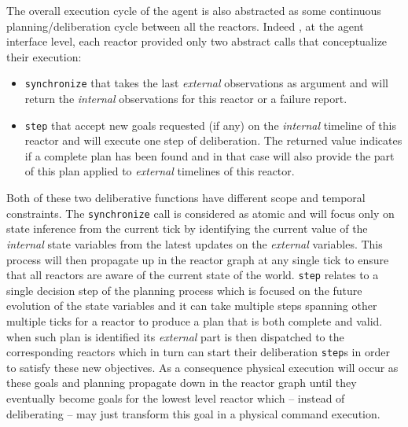 The overall execution cycle of the agent is also abstracted as some
continuous planning/deliberation cycle between all the
reactors. Indeed , at the agent interface level, each reactor provided
only two abstract calls that conceptualize their execution:
\begin{itemize}
\item \texttt{synchronize} that takes the last {\em external}
  observations as argument and will return the {\em internal}
  observations for this reactor or a failure report.
\item \texttt{step} that accept new goals requested (if any) on the
  {\em internal} timeline of this reactor and will execute one step of
  deliberation. The returned value indicates if a complete plan has
  been found and in that case will also provide the part of this plan
  applied to {\em external} timelines of this reactor.
\end{itemize}
Both of these two deliberative functions have different scope and
temporal constraints. The \texttt{synchronize} call is considered as
atomic and will focus only on state inference from the current tick by
identifying the current value of the {\em internal} state variables
from the latest updates on the {\em external} variables. This process
will then propagate up in the reactor graph at any single tick to
ensure that all reactors are aware of the current state of the
world. \texttt{step} relates to a single decision step of the planning
process which is focused on the future evolution of the state
variables and it can take multiple steps spanning other multiple
ticks for a reactor to produce a plan that is both complete and
valid. when such plan is identified its {\em external} part is then
dispatched to the corresponding reactors which in turn can start their
deliberation \texttt{step}s in order to satisfy these new
objectives. As a consequence physical execution will occur as these
goals and planning propagate down in the reactor graph until they
eventually become goals for the lowest level reactor which -- instead
of deliberating -- may just transform this goal in a physical command
execution. 

